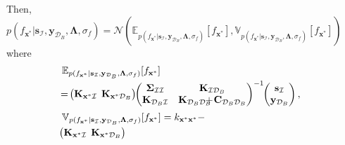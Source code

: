 \documentclass[conference]{IEEEtran}
\begin{document}
	Then, $p(f_{\mathbf{x}^*}|\mathbf{s}_\mathcal{I},\mathbf{y}_{\mathcal{D}_B},\mathbf{\Lambda},\sigma_f)
	=\mathcal{N}(\mathbb{E}_{p(f_{\mathbf{x}^*}|\mathbf{s}_\mathcal{I},\mathbf{y}_{\mathcal{D}_B},\mathbf{\Lambda},\sigma_f)}[f_{\mathbf{x}^*}],\mathbb{V}_{p(f_{\mathbf{x}^*}|\mathbf{s}_\mathcal{I},\mathbf{y}_{\mathcal{D}_B},\mathbf{\Lambda},\sigma_f)}[f_{\mathbf{x}^*}])$ 
	where
	\begin{equation*}
		\hspace{-1.7mm}
		\begin{array}{l}
			\displaystyle\mathbb{E}_{p(f_{\mathbf{x}^*}|\mathbf{s}_\mathcal{I},\mathbf{y}_{\mathcal{D}_B},\mathbf{\Lambda},\sigma_f)}[f_{\mathbf{x}^*}] \vspace{1mm}\\
			\hspace{-.5mm}=\hspace{-.5mm}\begin{pmatrix}
				\mathbf{K}_{\mathbf{x}^*\mathcal{I}} & \hspace{-2mm}\mathbf{K}_{\mathbf{x}^*\mathcal{D}_B}
			\end{pmatrix}
			\hspace{-1mm}
			\begin{pmatrix}
				\mathbf{\Sigma}_\mathcal{II} & \mathbf{K}_{\mathcal{I}\mathcal{D}_B} \\
				\mathbf{K}_{\mathcal{D}_B\mathcal{I}} & \mathbf{K}_{\mathcal{D}_B\mathcal{D}_B}\hspace{-3mm} + \hspace{-0.5mm} \mathbf{C}_{\mathcal{D}_B\mathcal{D}_B}
			\end{pmatrix}^{-1}
			\hspace{-1mm}
			\begin{pmatrix}
				\mathbf{s}_\mathcal{I} \\
				\mathbf{y}_{\mathcal{D}_B}
			\end{pmatrix}  ,\vspace{2mm}\\
			\displaystyle\mathbb{V}_{p(f_{\mathbf{x}^*}|\mathbf{s}_\mathcal{I},\mathbf{y}_{\mathcal{D}_B},\mathbf{\Lambda},\sigma_f)}[f_{\mathbf{x}^*}] =k_{\mathbf{x}^*\mathbf{x}^*}-\vspace{1mm}\\
			\hspace{-1mm}
			\begin{pmatrix}
				\mathbf{K}_{\mathbf{x}^*\mathcal{I}} & \hspace{-2mm}\mathbf{K}_{\mathbf{x}^*\mathcal{D}_B}
			\end{pmatrix}

\end{array}
\end{equation*}
\end{document}
